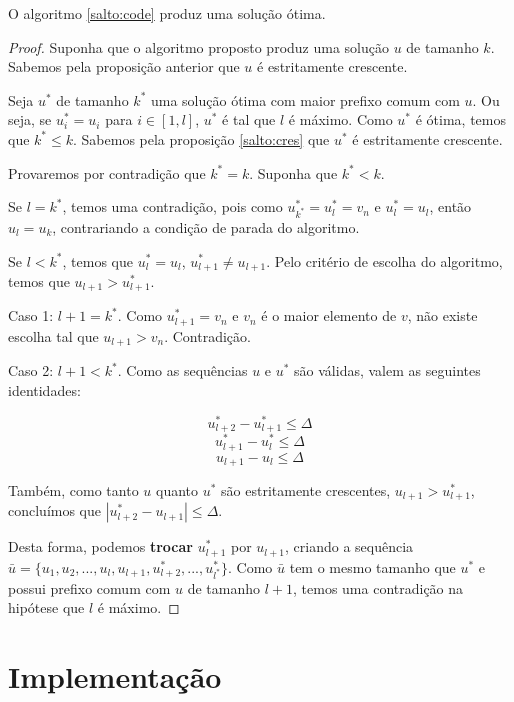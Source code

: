 \begin{theo} \label{salto:proof}
O algoritmo \ref{salto:code} produz uma solução ótima.
\end{theo}
\begin{proof}

Suponha que o algoritmo proposto produz uma solução $u$ de tamanho $k$. Sabemos pela proposição anterior que $u$ é estritamente crescente.

Seja $u^*$ de tamanho $k^*$ uma solução ótima com maior prefixo comum com $u$. Ou seja, se $u^*_i = u_i$ para $i \in [1, l]$, $u^*$ é tal que $l$ é máximo. Como $u^*$ é ótima, temos que $k^* \leq k$. Sabemos pela proposição \ref{salto:cres} que $u^*$ é estritamente crescente.

Provaremos por contradição que $k^* = k$.  Suponha que $k^* < k$.

Se $l = k^*$, temos uma contradição, pois como $u^*_{k^*} = u^*_l = v_n$ e $u^*_l = u_l$, então $u_l = u_k$, contrariando a condição de parada do algoritmo. 

Se $l < k^*$, temos que $u^*_{l} = u_{l}$, $u^*_{l + 1} \neq u_{l + 1}$. Pelo critério de escolha do algoritmo, temos que $u_{l + 1} > u^*_{l + 1}$.

Caso 1: $l + 1 = k^*$. Como $u^*_{l + 1} = v_n$ e $v_n$ é o maior elemento de $v$, não existe escolha tal que $u_{l + 1} > v_n$. Contradição.

Caso 2: $l + 1 < k^*$. Como as sequências $u$ e $u^*$ são válidas, valem as seguintes identidades:

$$u^*_{l + 2} - u^*_{l + 1} \leq \Delta$$
$$u^*_{l + 1} - u^*_{l} \leq \Delta$$
$$u_{l + 1} - u_{l} \leq \Delta$$

Também, como tanto $u$ quanto $u^*$ são estritamente crescentes, $u_{l + 1} > u^*_{l + 1}$, concluímos que $|u^*_{l + 2} - u_{l + 1}| \leq \Delta$.

Desta forma, podemos \textbf{trocar} $u^*_{l + 1}$ por $u_{l + 1}$, criando a sequência $\bar{u} = \{u_1, u_2, ..., u_l, u_{l + 1}, u^*_{l + 2}, ..., u^*_{l^*}\}$. Como $\bar{u}$ tem o mesmo tamanho que $u^*$ e possui prefixo comum com $u$ de tamanho $l + 1$, temos uma contradição na hipótese que $l$ é máximo.

\end{proof}

\section{Implementação}

